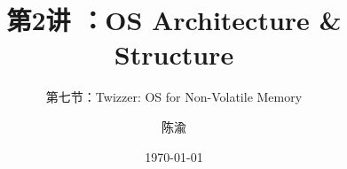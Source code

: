 


\title[第2讲]{第2讲 ：OS Architecture \& Structure} %
\subtitle{第七节：Twizzer: OS for Non-Volatile Memory }
\author{陈渝} %
\date{\today} %




\begin{frame}
\titlepage %
\end{frame}

